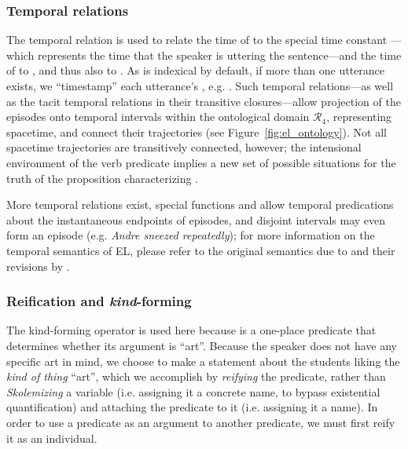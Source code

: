 \subsubsection{Temporal relations}
The temporal relation  is used to relate the time of  to the special time constant ---which represents the time that the speaker is uttering the sentence---and the time of  to , and thus also  to .
As  is indexical by default, if more than one utterance exists, we ``timestamp'' each utterance's , e.g. .
Such temporal relations---as well as the tacit temporal relations in their transitive closures---allow projection of the episodes onto temporal intervals within the ontological domain $\mathcal{R}_{4}$, representing spacetime, and connect their trajectories (see Figure~\ref{fig:el_ontology}). Not all spacetime trajectories are transitively connected, however; the intensional environment of the verb predicate  implies a new set of possible situations for the truth of the  proposition characterizing .

More temporal relations exist, special functions  and  allow temporal predications about the instantaneous endpoints of episodes, and disjoint intervals may even form an episode (e.g. \textit{Andre sneezed repeatedly}); for more information on the temporal semantics of EL, please refer to the original semantics due to \citet{hwang1993episodic} and their revisions by \citet{len-situations-2000}.

\subsubsection{Reification and \textit{kind}-forming}
The kind-forming operator  is used here because  is a one-place predicate that determines whether its argument is ``art''. Because the speaker does not have any specific art in mind, we choose to make a statement about the students liking the \textit{kind of thing} ``art'', which we accomplish by \textit{reifying} the  predicate, rather than \textit{Skolemizing} a variable (i.e. assigning it a concrete name, to bypass existential quantification) and attaching the predicate to it (i.e. assigning it a name). In order to use a predicate as an argument to another predicate, we must first reify it as an individual.

